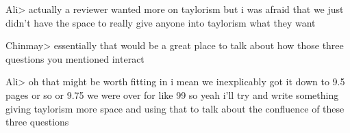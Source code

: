 \documentclass[trackingWork]{subfiles}
\begin{document}
{Ali> actually a reviewer wanted more on taylorism but i was afraid that we just didn't have the space to really give anyone into taylorism what they want

Chinmay> essentially that would be a great place to talk about how those three questions you mentioned interact

Ali> oh
that might be worth fitting in
i mean we inexplicably got it down to 9.5 pages or so
or 9.75
we were over for like 99%
so yeah i'll try and write something giving taylorism more space and using that to talk about the confluence of these three questions
}
\end{document}
